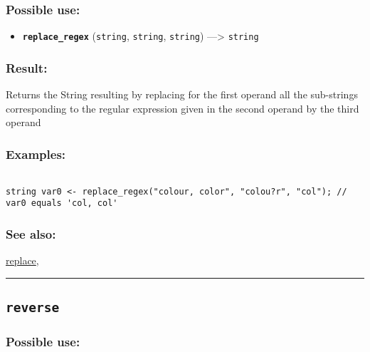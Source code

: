 \documentclass[]{book}
\providecommand{\tightlist}{%
  \setlength{\itemsep}{0pt}\setlength{\parskip}{0pt}}
\theoremstyle{definition}
\theoremstyle{definition}
\theoremstyle{definition}
\theoremstyle{remark}
\begin{document}
\subsubsection{Possible use:}\label{possible-use-434}

\begin{itemize}
\tightlist
\item
  \textbf{\texttt{replace\_regex}} (\texttt{string}, \texttt{string},
  \texttt{string}) ---\textgreater{} \texttt{string}
\end{itemize}

\subsubsection{Result:}\label{result-420}

Returns the String resulting by replacing for the first operand all the
sub-strings corresponding to the regular expression given in the second
operand by the third operand

\subsubsection{Examples:}\label{examples-298}

\begin{verbatim}
 
string var0 <- replace_regex("colour, color", "colou?r", "col"); // var0 equals 'col, col'
\end{verbatim}

\subsubsection{See also:}\label{see-also-174}

\href{OperatorsNR\#replace}{replace},

\begin{center}\rule{0.5\linewidth}{\linethickness}\end{center}

\subsection{\texorpdfstring{\texttt{reverse}}{reverse}}\label{reverse}

\subsubsection{Possible use:}\label{possible-use-435}
\end{document}

